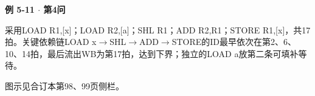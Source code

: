 {\color{ink}\bfseries 例 5-11 \(\cdot \) 第4问}\par\vspace{1bp}采用LOAD R1,\allowbreak{}[x]；LOAD R2,\allowbreak{}[a]；SHL R1；ADD R2,\allowbreak{}R1；STORE R1,\allowbreak{}[x]，共17拍。关键依赖链LOAD x\(\to \)SHL\(\to \)ADD\(\to \)STORE的ID最早依次在第2、6、10、14拍，最后流出WB为第17拍，达到下界；独立的LOAD a放第二条可填补等待。\par {\color{ink}图示见合订本第98、99页侧栏。}
